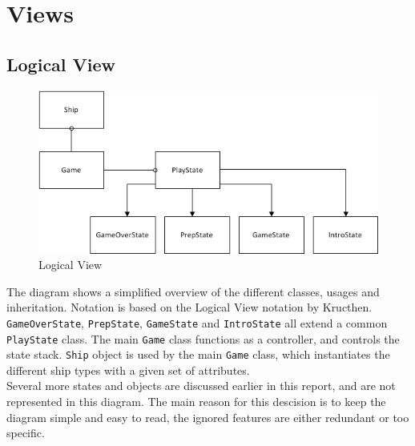 \chapter{Views}
\section{Logical View}

\begin{figure}[h]
	\includegraphics[width=\textwidth]{LogicalView.png}
	\caption{Logical View}
	\label{fig:LogicalView}
\end{figure}

The diagram shows a simplified overview of the different classes, usages and inheritation. Notation is based on the Logical View notation by Kructhen.\cite{kruchten} 
\\
\texttt{GameOverState}, \texttt{PrepState}, \texttt{GameState} and \texttt{IntroState} all extend a common \texttt{PlayState} class. The main \texttt{Game} class functions as a controller, and controls the state stack. \texttt{Ship} object is used by the main \texttt{Game} class, which instantiates the different ship types with a given set of attributes.
\\
Several more states and objects are discussed earlier in this report, and are not represented in this diagram. The main reason for this descision is to keep the diagram simple and easy to read, the ignored features are either redundant or too specific. 


